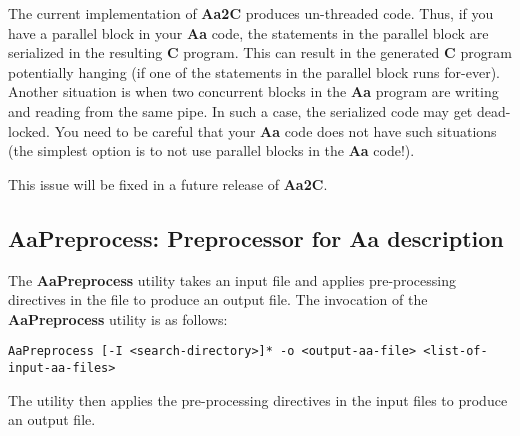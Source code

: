 The current implementation of {\bf Aa2C} produces un-threaded code.
Thus, if you have a parallel block in your {\bf Aa} code, the
statements in the parallel block are serialized in the resulting
{\bf C} program.  This can result in the generated {\bf C} program
potentially hanging (if one of the statements in the parallel
block runs for-ever).   Another situation is when two
concurrent blocks in the {\bf Aa} program are writing and reading
from the same pipe.  In such a case, the serialized code may
get dead-locked.  You need to be careful that your {\bf Aa} code
does not have such situations (the simplest option is
to not use parallel blocks in the {\bf Aa} code!).

This issue will be fixed in a future release of {\bf Aa2C}.

\subsection{{\bf AaPreprocess}: Preprocessor for {\bf Aa} description}

The {\bf AaPreprocess} utility takes an input \Aa file and applies pre-processing
directives in the file  to produce an output \Aa file.   The invocation of the
{\bf AaPreprocess} utility is as follows:
\begin{verbatim}
AaPreprocess [-I <search-directory>]* -o <output-aa-file> <list-of-input-aa-files>
\end{verbatim}

The utility then applies the pre-processing directives in the input \Aa files
to produce an output \Aa file.

